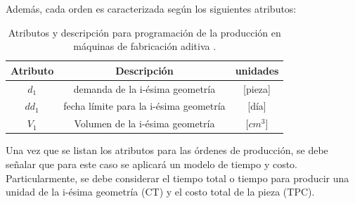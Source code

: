 \begin{description}
 Además, cada orden es caracterizada según los siguientes atributos:\\

\begin{table}[H]
\centering

\begin{tabular}{|c|c|c|}

\hline
Atributo & Descripción & unidades\\
\hline 
$d_1$ & demanda de la i-ésima geometría  & [pieza] \\ 
\hline 
$dd_1$ & fecha límite para la i-ésima geometría & [día] \\ 
\hline 
$V_1$ & Volumen de la i-ésima geometría & [$cm^3$] \\ 
\hline 

\end{tabular} 
\caption{Atributos y descripción para programación de la producción en máquinas de fabricación aditiva \parencite{fera2018}.}
\end{table}

Una vez que se listan los atributos para las órdenes de producción, se debe señalar que para  este caso se aplicará un modelo de tiempo y costo. Particularmente, se debe considerar el tiempo total o tiempo para producir una unidad de la i-ésima geometría (CT) y el costo total de la pieza (TPC).



\end{description}






